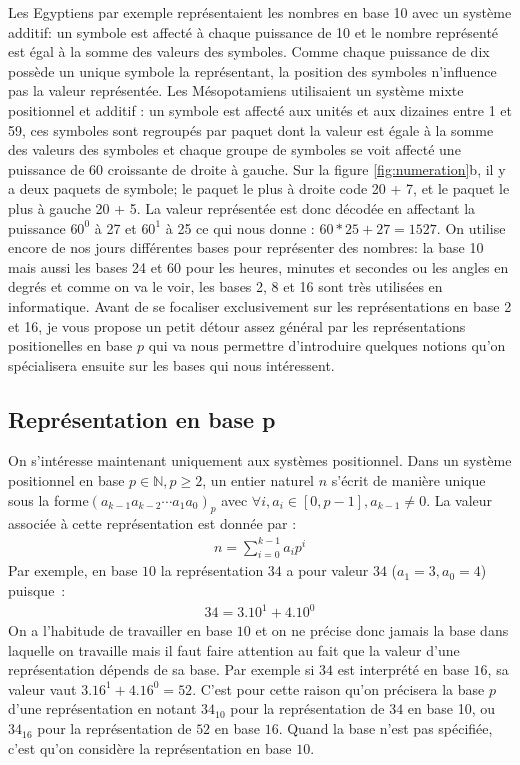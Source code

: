 Les Egyptiens par exemple représentaient les nombres en base 10 avec un système additif: un symbole est affecté à chaque puissance de 10 et le nombre représenté est égal à la somme des valeurs des symboles. Comme chaque puissance de dix possède un unique symbole la représentant, la position des symboles n'influence pas la valeur représentée. Les Mésopotamiens utilisaient un système mixte positionnel et additif : un symbole est affecté aux unités et aux dizaines entre 1 et 59, ces symboles sont regroupés par paquet dont la valeur est égale à la somme des valeurs des symboles et chaque groupe de symboles se voit affecté une puissance de 60 croissante de droite à gauche. Sur la figure \ref{fig:numeration}b, il y a deux paquets de symbole; le paquet le plus à droite code 20 + 7, et le paquet le plus à gauche 20 + 5. La valeur représentée est donc décodée en affectant la puissance $60^0$ à 27 et $60^1$ à 25 ce qui nous donne : $60 * 25 + 27 = 1527$. On utilise encore de nos jours différentes bases pour représenter des nombres: la base 10 mais aussi les bases 24 et 60 pour les heures, minutes et secondes ou les angles en degrés et comme on va le voir, les bases 2, 8 et 16 sont très utilisées en informatique. Avant de se focaliser exclusivement sur les représentations en base 2 et 16, je vous propose un petit détour assez général par les représentations positionelles en base $p$ qui va nous permettre d'introduire quelques notions qu'on spécialisera ensuite sur les bases qui nous intéressent.


\subsection{Représentation en base p}

On s'intéresse maintenant uniquement aux systèmes positionnel. Dans un système positionnel en base $p \in \mathbb{N}, p \geq 2$, un entier naturel $n$ s'écrit de manière unique sous la forme$(a_{k-1}a_{k-2}\cdots a_{1}a_{0})_p$ avec $\forall i, a_i \in [0, p-1], a_{k-1} \neq 0$. La valeur associée à cette représentation est donnée par :
\begin{eqnarray*}
n = \sum_{i=0}^{k-1} a_i p^i
\end{eqnarray*}
Par exemple, en base $10$ la représentation $34$ a pour valeur $34$ ($a_1 = 3, a_0 = 4$) puisque~:
\begin{eqnarray*}
34 = 3. 10^1 + 4. 10^0
\end{eqnarray*}
On a l'habitude de travailler en base $10$ et on ne précise donc jamais la base dans laquelle on travaille mais il faut faire attention au fait que la valeur d'une représentation dépends de sa base. Par exemple si $34$ est interprété en base $16$, sa valeur vaut $3.16^1 + 4.16^0 = 52$. C'est pour cette raison qu'on précisera la base $p$ d'une représentation en notant $34_{10}$ pour la représentation de $34$ en base 10, ou $34_{16}$ pour la représentation de $52$ en base $16$. Quand la base n'est pas spécifiée, c'est qu'on considère la représentation en base $10$.\\

